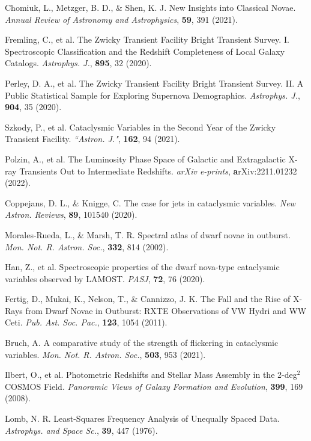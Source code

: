 \documentclass{nature_plusfigure}
\newcommand{\mn}{{Mon. Not. R. Astron. Soc.}}
\newcommand{\nar}{{New Astron. Reviews}}
\newcommand{\mnras}{\mn}
\newcommand{\aj}{{``Astron. J."}}
\newcommand{\apj}{{Astrophys. J.}}
\newcommand{\apss}{{Astrophys. and Space Sc.}}
\newcommand{\pasj}{{PASJ}}
\newcommand{\pasp}{{Pub. Ast. Soc. Pac.}}
\newcommand{\araa}{Annual Review of Astronomy and Astrophysics}
\begin{document}
\begin{methods}
\begin{thebibliography}{10}
 Chomiuk, L., Metzger, B. D., \& Shen, K. J. New Insights into Classical Novae. \emph{\araa}, \textbf{59}, 391 (2021). 

 Fremling, C., et al. The Zwicky Transient Facility Bright Transient Survey. I. Spectroscopic Classification and the Redshift Completeness of Local Galaxy Catalogs. \emph{\apj}, \textbf{895}, 32 (2020).

 Perley, D. A., et al. The Zwicky Transient Facility Bright Transient Survey. II. A Public Statistical Sample for Exploring Supernova Demographics. \emph{\apj}, \textbf{904}, 35 (2020). 

 Szkody, P., et al. Cataclysmic Variables in the Second Year of the Zwicky Transient Facility. \emph{\aj}, \textbf{162}, 94 (2021). 

 Polzin, A., et al. The Luminosity Phase Space of Galactic and Extragalactic X-ray Transients Out to Intermediate Redshifts. \emph{arXiv e-prints}, \textbf arXiv:2211.01232 (2022). 

 Coppejans, D. L., \& Knigge, C. The case for jets in cataclysmic variables. \emph{\nar}, \textbf{89}, 101540 (2020). 

 Morales-Rueda, L., \& Marsh, T. R. Spectral atlas of dwarf novae in outburst. \emph{\mnras}, \textbf{332}, 814 (2002). 

 Han, Z., et al. Spectroscopic properties of the dwarf nova-type cataclysmic variables observed by LAMOST. \emph{\pasj}, \textbf{72}, 76 (2020). 

 Fertig, D., Mukai, K., Nelson, T., \& Cannizzo, J. K. The Fall and the Rise of X-Rays from Dwarf Novae in Outburst: RXTE Observations of VW Hydri and WW Ceti. \emph{\pasp}, \textbf{123}, 1054 (2011). 

 Bruch, A. A comparative study of the strength of flickering in cataclysmic variables. \emph{\mnras}, \textbf{503}, 953 (2021). 

 Ilbert, O., et al. Photometric Redshifts and Stellar Mass Assembly in the 2-deg$^2$ COSMOS Field. \emph{Panoramic Views of Galaxy Formation and Evolution}, \textbf{399}, 169 (2008). 


 Lomb, N. R. Least-Squares Frequency Analysis of Unequally Spaced Data. \emph{\apss}, \textbf{39}, 447 (1976). 


\end{thebibliography}
\end{methods}
\end{document}

